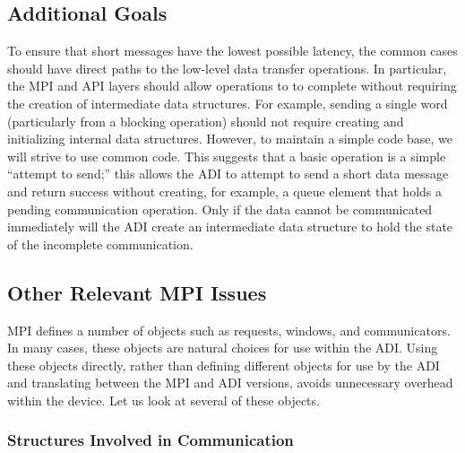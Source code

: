 \subsection{Additional Goals}
To ensure that short messages have the lowest possible latency, the
common cases should have direct paths to the low-level data transfer
operations.  In particular, the MPI and API layers
should allow operations to to complete without requiring the creation
of intermediate data structures.  For example, sending a single word
(particularly from a blocking  operation) should not
require creating and initializing internal data structures.  However,
to maintain a simple code base, we will strive to use common code.
This suggests that a basic operation is a simple ``attempt to
send;'' this allows the ADI to attempt to send a short data message
and return success without creating, for example, a queue element that
holds a pending communication operation.  Only if the data cannot be
communicated immediately will the ADI create an intermediate data
structure to hold the state of the incomplete communication.  

\subsection{Other Relevant MPI Issues}
MPI defines a number of objects such as requests, windows, and
communicators.  In many cases, these objects are natural choices for
use within the ADI.  Using these objects directly, rather than defining
different objects for use by the ADI and translating between the MPI and ADI
versions, avoids unnecessary 
overhead within the device.  Let us look at several of these objects.

\subsubsection{Structures Involved in Communication}

